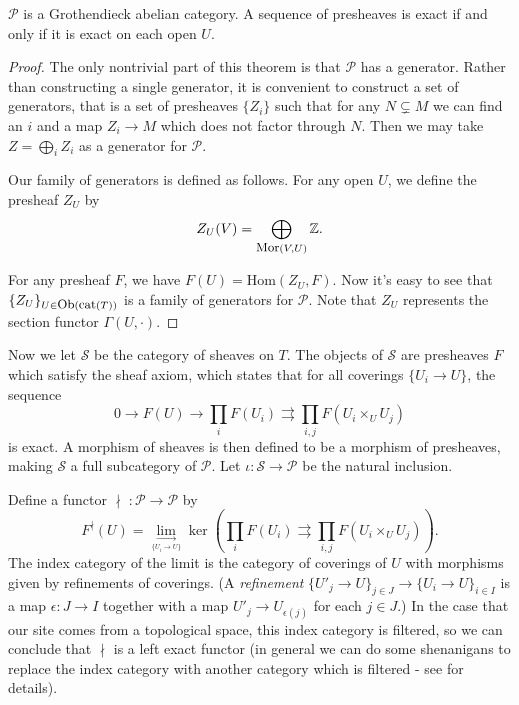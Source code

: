 \begin{prop} $\mathcal{P}$ is a Grothendieck abelian category. A sequence of presheaves is exact if and only if it is exact on each open $U$.
\end{prop}
\begin{proof} The only nontrivial part of this theorem is that $\mathcal{P}$ has a generator. Rather than constructing a single generator, it is convenient to construct a set of generators, that is a set of presheaves $\{Z_i\}$ such that for any $N\subsetneq M$ we can find an $i$ and a map $Z_i \rightarrow M$ which does not factor through $N$. Then we may take $Z = \bigoplus_i Z_i$ as a generator for $\mathcal{P}$.

Our family of generators is defined as follows. For any open $U$, we define the presheaf $Z_U$ by
\[
Z_U(V) = \bigoplus_{\mbox{\small Mor}(V,U)} \mathbb{Z}.
\]

For any presheaf $F$, we have $F(U) = \mbox{Hom}(Z_U, F)$. Now it's easy to see that $\{Z_U\}_{U\in\mbox{\small Ob}(\mbox{\small cat}(T))}$ is a family of generators for $\mathcal{P}$. Note that $Z_U$ represents the section functor $\Gamma(U,\cdot)$.
\end{proof}

Now we let $\mathcal{S}$ be the category of sheaves on $T$. The objects of $\mathcal{S}$ are presheaves $F$ which satisfy the sheaf axiom, which states that for all coverings $\{U_i\rightarrow U\}$, the sequence
\[
0 \rightarrow F(U) \rightarrow \prod_i F(U_i) \rightrightarrows \prod_{i,j} F(U_i \times_U U_j)
\]
is exact. A morphism of sheaves is then defined to be a morphism of presheaves, making $\mathcal{S}$ a full subcategory of $\mathcal{P}$. Let $\iota : \mathcal{S} \rightarrow \mathcal{P}$ be the natural inclusion.

Define a functor $\nmid \; : \mathcal{P} \rightarrow \mathcal{P}$ by
\[
F^\nmid(U) = \underset{\underset{\{U_i\rightarrow U\}}{\longrightarrow}}{\lim} \ker(\prod_i F(U_i) \rightrightarrows \prod_{i,j} F(U_i \times_U U_j)).
\]
The index category of the limit is the category of coverings of $U$ with morphisms given by refinements of coverings. (A \emph{refinement} $\{U'_j \rightarrow U\}_{j\in J} \rightarrow \{U_i\rightarrow U\}_{i\in I}$ is a map $\epsilon : J \rightarrow I$ together with a map $U'_j \rightarrow U_{\epsilon(j)}$ for each $j\in J$.) In the case that our site comes from a topological space, this index category is filtered, so we can conclude that $\nmid$ is a left exact functor (in general we can do some shenanigans to replace the index category with another category which is filtered - see \cite{etale} for details).

